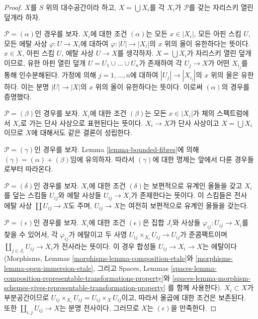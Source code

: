 \begin{proof}
$X$를 $S$ 위의 대수공간이라 하고, $X = \bigcup X_i$를 각 $X_i$가
$\mathcal{P}$를 갖는 자리스키 열린 덮개라 하자.

\medskip\noindent
$\mathcal{P} = (\alpha)$인 경우를 보자. $X_i$에 대한 조건
$(\alpha)$는 모든 $x \in |X_i|$, 모든 아핀 스킴 $U$, 모든 에탈 사상
$\varphi : U \to X_i$에 대하여 $\varphi : |U| \to |X_i|$의 $x$ 위의
올이 유한하다는 뜻이다.
$x \in X$, 아핀 스킴 $U$, 에탈 사상 $U \to X$를 생각하자.
$X = \bigcup X_i$가 자리스키 열린 덮개이므로,
유한 아핀 열린 덮개 $U = U_1 \cup \ldots \cup U_n$가 존재하여
각 $U_j \to X$가 어떤 $X_{i_j}$를 통해 인수분해된다.
가정에 의해 $j = 1, \ldots, n$에 대하여
$|U_j | \to |X_{i_j}|$의 $x$ 위의 올은 유한하다.
이는 분명 $|U| \to |X|$의 $x$ 위의 올이 유한하다는 뜻이다.
이로써 $(\alpha)$의 경우를 증명했다.

\medskip\noindent
$\mathcal{P} = (\beta)$인 경우를 보자. $X_i$에 대한 조건
$(\beta)$는 모든 $x \in |X_i|$가 체의 스펙트럼에서 $X_i$로 가는
단사 사상으로 표현된다는 뜻이다. $X_i \to X$가 단사 사상이고
$X = \bigcup X_i$이므로 $X$에 대해서도 같은 결론이 성립한다.

\medskip\noindent
$\mathcal{P} = (\gamma)$인 경우를 보자. Lemma
\ref{lemma-bounded-fibres}에 의해 $(\gamma) = (\alpha) + (\beta)$임에
유의하자. 따라서 $(\gamma)$에 대한 명제는 앞에서 다룬 경우들로부터
따라온다.

\medskip\noindent
$\mathcal{P} = (\delta)$인 경우를 보자. $X_i$에 대한 조건
$(\delta)$는 보편적으로 유계인 올들을 갖고 $X_i$를 덮는 스킴들
$U_{ij}$와 에탈 사상들 $U_{ij} \to X_i$가 존재한다는 뜻이다.
이 스킴들은 전사 에탈 사상 $\coprod U_{ij} \to X$도 주며,
$U_{ij} \to X$는 여전히 보편적으로 유계인 올들을 갖는다.

\medskip\noindent
$\mathcal{P} = (\epsilon)$인 경우를 보자. $X_i$에 대한 조건
$(\epsilon)$은 집합 $J_i$와 사상들 $\varphi_{ij} : U_{ij} \to X_i$를
찾을 수 있어서, 각 $\varphi_{ij}$가 에탈이고 두 사영
$U_{ij} \times_{X_i} U_{ij} \to U_{ij}$가 준콤팩트이며
$\coprod_{j \in J_i} U_{ij} \to X_i$가 전사라는 뜻이다.
이 경우 합성들 $U_{ij} \to X_i \to X$는 에탈이다(Morphisms, Lemmas
\ref{morphisms-lemma-composition-etale}와
\ref{morphisms-lemma-open-immersion-etale}, 그리고 Spaces, Lemmas
\ref{spaces-lemma-composition-representable-transformations-property}와
\ref{spaces-lemma-morphism-schemes-gives-representable-transformation-property}
를 함께 사용한다).
$X_i \subset X$가 부분공간이므로
$U_{ij} \times_{X_i} U_{ij} = U_{ij} \times_X U_{ij}$이고, 따라서
올곱에 대한 조건은 보존된다. 또한
$\coprod_{i, j} U_{ij} \to X$는 분명 전사이다.
그러므로 $X$는 $(\epsilon)$을 만족한다.


\end{proof}

